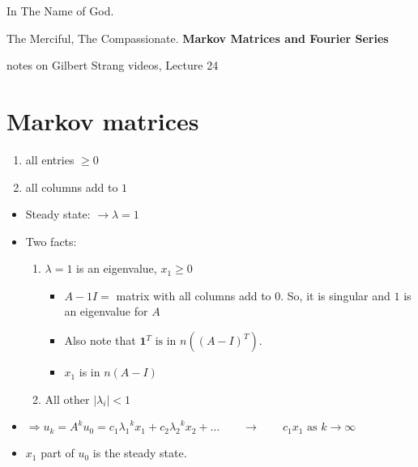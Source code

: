 \documentclass[a4paper,12pt]{article}
\theoremstyle{definition} \newtheorem{Theorem}{Theorem}
\begin{document}
\begin{center}
In The Name of God.

The Merciful, The Compassionate.
\vskip 1cm
{\Large\bfseries{Markov Matrices and Fourier Series}}

\vskip 0.2cm
\tiny{notes on Gilbert Strang videos, Lecture 24}
\end{center}

\section{Markov matrices}
\begin{enumerate}
\item all entries $\geq 0$
\item all columns add to $1$
\end{enumerate}
\begin{itemize}
	\item Steady state: $\rightarrow \lambda = 1$

	\item Two facts:
	\begin{enumerate}
		\item $\lambda = 1$ is an eigenvalue, $x_1 \geq 0$
		\begin{itemize}
			\item $A - 1I = $ matrix with all columns add to $0$. So, it is singular and
$1$ is an eigenvalue for $A$

			\item Also note that $\mathbf{1}^T\text{ is in }n((A-I)^T)$.
			
			\item $x_1$ is in $n(A-I)$
		\end{itemize}
		\item All other $|\lambda_i| < 1 $
	\end{enumerate}
	\item $\Rightarrow u_k = A^k u_0 = c_1 {\lambda_1}^k x_1 + c_2 {\lambda_2}^k x_2 + \ldots \qquad \rightarrow \qquad  c_1 x_1  \text{ as } k \rightarrow \infty$

	\item $x_1$ part of $u_0$ is the steady state.
\end{itemize}
\end{document}
